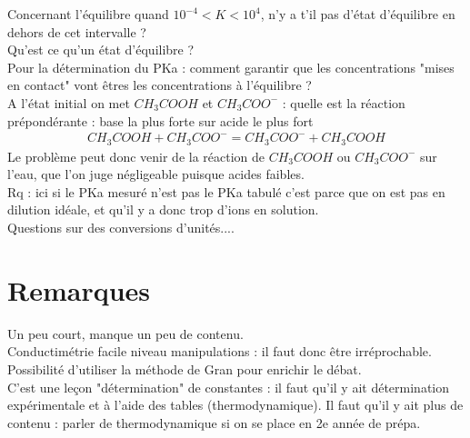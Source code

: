 \documentclass[12pt,prb,aps,epsf]{article}
\begin{document}
Concernant l'équilibre quand $10^{-4}<K<10^4$, n'y a t'il pas d'état d'équilibre en dehors de cet intervalle ?\\

Qu'est ce qu'un état d'équilibre ?\\

Pour la détermination du PKa : comment garantir que les concentrations "mises en contact" vont êtres les concentrations à l'équilibre ?\\
A l'état initial on met $CH_3COOH$ et $CH_3COO^-$ : quelle est la réaction prépondérante : base la plus forte sur acide le plus fort 
\begin{eqnarray}
CH_3COOH + CH_3COO^- = CH_3COO^- + CH_3COOH
\end{eqnarray}
Le problème peut donc venir de la réaction de $CH_3COOH$ ou $CH_3COO^-$ sur l'eau, que l'on juge négligeable puisque acides faibles.\\
Rq : ici si le PKa mesuré n'est pas le PKa tabulé c'est parce que on est pas en dilution idéale, et qu'il y a donc trop d'ions en solution.\\

Questions sur des conversions d'unités....\\

\section*{Remarques}
Un peu court, manque un peu de contenu.\\
Conductimétrie facile niveau manipulations : il faut donc être irréprochable.\\
Possibilité d'utiliser la méthode de Gran pour enrichir le débat.\\
C'est une leçon "détermination" de constantes : il faut qu'il y ait détermination expérimentale et à l'aide des tables (thermodynamique). Il faut qu'il y ait plus de contenu : parler de thermodynamique si on se place en 2e année de prépa.
\end{document}

